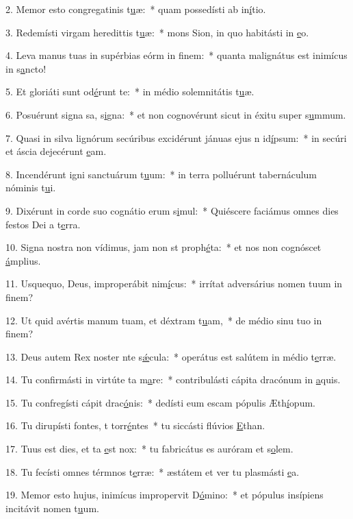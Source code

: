 2. Memor esto congregatinis t\uline{u}æ:~* quam possedísti ab in\uline{í}tio.\par 
3. Redemísti virgam heredittis t\uline{u}æ:~* mons Sion, in quo habitásti in \uline{e}o.\par 
4. Leva manus tuas in supérbias eórm in f\uline{i}nem:~* quanta malignátus est inimícus in s\uline{a}ncto!\par 
5. Et gloriáti sunt  od\uline{é}runt te:~* in médio solemnitátis t\uline{u}æ.\par 
6. Posuérunt signa sa, s\uline{i}gna:~* et non cognovérunt sicut in éxitu super s\uline{u}mmum.\par 
7. Quasi in silva lignórum secúribus excidérunt jánuas ejus n id\uline{í}psum:~* in secúri et áscia dejecérunt \uline{e}am.\par 
8. Incendérunt igni sanctuárum t\uline{u}um:~* in terra polluérunt tabernáculum nóminis t\uline{u}i.\par 
9. Dixérunt in corde suo cognátio erum s\uline{i}mul:~* Quiéscere faciámus omnes dies festos Dei a t\uline{e}rra.\par 
10. Signa nostra non vídimus, jam non st proph\uline{é}ta:~* et nos non cognóscet \uline{á}mplius.\par 
11. Usquequo, Deus, improperábit nim\uline{í}cus:~* irrítat adversárius nomen tuum in f\uline{i}nem?\par 
12. Ut quid avértis manum tuam, et déxtram t\uline{u}am,~* de médio sinu tuo in f\uline{i}nem?\par 
13. Deus autem Rex noster nte s\uline{ǽ}cula:~* operátus est salútem in médio t\uline{e}rræ.\par 
14. Tu confirmásti in virtúte ta m\uline{a}re:~* contribulásti cápita dracónum in \uline{a}quis.\par 
15. Tu confregísti cápit drac\uline{ó}nis:~* dedísti eum escam pópulis Æth\uline{í}opum.\par 
16. Tu dirupísti fontes, t torr\uline{é}ntes~* tu siccásti flúvios \uline{E}than.\par 
17. Tuus est dies, et ta \uline{e}st nox:~* tu fabricátus es auróram et s\uline{o}lem.\par 
18. Tu fecísti omnes térmnos t\uline{e}rræ:~* æstátem et ver tu plasmásti \uline{e}a.\par 
19. Memor esto hujus, inimícus impropervit D\uline{ó}mino:~* et pópulus insípiens incitávit nomen t\uline{u}um.\par 
